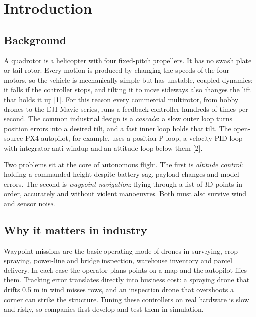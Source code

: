 \section{Introduction}
\subsection{Background}
A quadrotor is a helicopter with four fixed-pitch propellers. It has no swash plate or tail rotor. Every motion is produced by changing the speeds of the four motors, so the vehicle is mechanically simple but has unstable, coupled dynamics: it falls if the controller stops, and tilting it to move sideways also changes the lift that holds it up [1]. For this reason every commercial multirotor, from hobby drones to the DJI Mavic series, runs a feedback controller hundreds of times per second. The common industrial design is a \emph{cascade}: a slow outer loop turns position errors into a desired tilt, and a fast inner loop holds that tilt. The open-source PX4 autopilot, for example, uses a position P loop, a velocity PID loop with integrator anti-windup and an attitude loop below them [2].

Two problems sit at the core of autonomous flight. The first is \emph{altitude control}: holding a commanded height despite battery sag, payload changes and model errors. The second is \emph{waypoint navigation}: flying through a list of 3D points in order, accurately and without violent manoeuvres. Both must also survive wind and sensor noise.

\subsection{Why it matters in industry}
Waypoint missions are the basic operating mode of drones in surveying, crop spraying, power-line and bridge inspection, warehouse inventory and parcel delivery. In each case the operator plans points on a map and the autopilot flies them. Tracking error translates directly into business cost: a spraying drone that drifts 0.5 m in wind misses rows, and an inspection drone that overshoots a corner can strike the structure. Tuning these controllers on real hardware is slow and risky, so companies first develop and test them in simulation.

